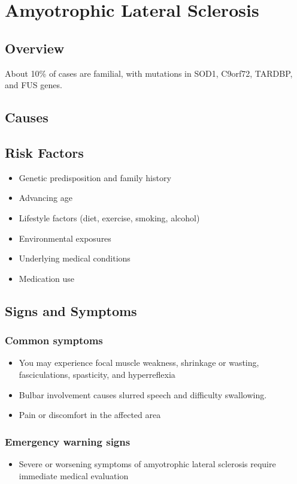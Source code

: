 \chapter{Amyotrophic Lateral Sclerosis}
\label{sec:Amyotrophic Lateral Sclerosis}

\section{Overview}
About 10\% of cases are familial, with mutations in SOD1, C9orf72, TARDBP, and FUS genes.
\section{Causes}
\section{Risk Factors}

\begin{itemize}[noitemsep]
  \item Genetic predisposition and family history
  \item Advancing age
  \item Lifestyle factors (diet, exercise, smoking, alcohol)
  \item Environmental exposures
  \item Underlying medical conditions
  \item Medication use
\end{itemize}
\section{Signs and Symptoms}

\subsection{Common symptoms}
\begin{itemize}[noitemsep]
  \item You may experience focal muscle weakness, shrinkage or wasting, fasciculations, spasticity, and hyperreflexia
  \item Bulbar involvement causes slurred speech and difficulty swallowing.
  \item Pain or discomfort in the affected area
  \end{itemize}

\subsection{Emergency warning signs}
\begin{itemize}[noitemsep]
  \item Severe or worsening symptoms of amyotrophic lateral sclerosis require immediate medical evaluation
\end{itemize}
